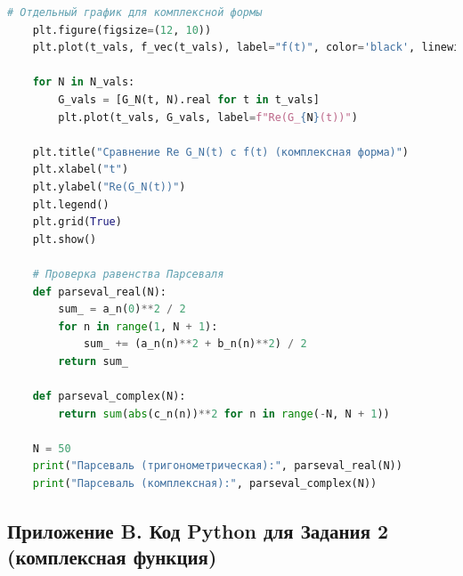 \begin{lstlisting}[language=Python, caption=Вычисление и визуализация ряда Фурье для квадратной волны]
    # Отдельный график для комплексной формы
    plt.figure(figsize=(12, 10))
    plt.plot(t_vals, f_vec(t_vals), label="f(t)", color='black', linewidth=2)
    
    for N in N_vals:
        G_vals = [G_N(t, N).real for t in t_vals]
        plt.plot(t_vals, G_vals, label=f"Re(G_{N}(t))")
    
    plt.title("Сравнение Re G_N(t) с f(t) (комплексная форма)")
    plt.xlabel("t")
    plt.ylabel("Re(G_N(t))")
    plt.legend()
    plt.grid(True)
    plt.show()
    
    # Проверка равенства Парсеваля
    def parseval_real(N):
        sum_ = a_n(0)**2 / 2
        for n in range(1, N + 1):
            sum_ += (a_n(n)**2 + b_n(n)**2) / 2
        return sum_
    
    def parseval_complex(N):
        return sum(abs(c_n(n))**2 for n in range(-N, N + 1))
    
    N = 50
    print("Парсеваль (тригонометрическая):", parseval_real(N))
    print("Парсеваль (комплексная):", parseval_complex(N))
\end{lstlisting}


\subsection*{Приложение B. Код Python для Задания 2 (комплексная функция)}

